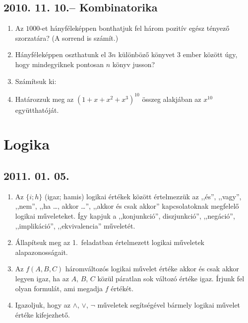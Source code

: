 \subsection*{2010. 11. 10.-- Kombinatorika}
\begin{enumerate}
\item Az $1000$-et hányféleképpen bonthatjuk fel három pozitív egész tényező szorzatára? (A sorrend is számít.)
\item Hányféleképpen oszthatunk el $3n$ különböző könyvet 3 ember között úgy, hogy mindegyiknek pontosan $n$ könyv jusson?
\item Számítsuk ki:
\item Határozzuk meg az $(1+x+x^{2}+x^{3})^{10}$ összeg alakjában az $x^{10}$ együtthatóját.
\end{enumerate}




\section{Logika}

\subsection*{2011. 01. 05.}
\begin{enumerate}
\item Az $\{i;h\}$ (igaz; hamis) logikai értékek között értelmezzük az ,,és'', ,,vagy'', ,,nem'', ,,ha \ldots, akkor \ldots'', ,,akkor és csak akkor'' kapcsolatoknak megfelelő logikai műveleteket. Így kapjuk a ,,konjunkció'', diszjunkció'', ,,negáció'', ,,implikáció'', ,,ekvivalencia'' műveletét.
\item Állapítsuk meg az 1.~feladatban értelmezett logikai műveletek alapazonosságait.
\item Az $f(A,B,C)$ háromváltozós logikai művelet értéke akkor és csak akkor legyen igaz, ha az $A$, $B$, $C$ közül páratlan sok változó értéke igaz. Írjunk fel olyan formulát, ami megadja $f$ értékét.
\item Igazoljuk, hogy az $\land$, $\lor$, $\neg$ műveletek segítségével bármely logikai művelet értéke kifejezhető.
\end{enumerate}

